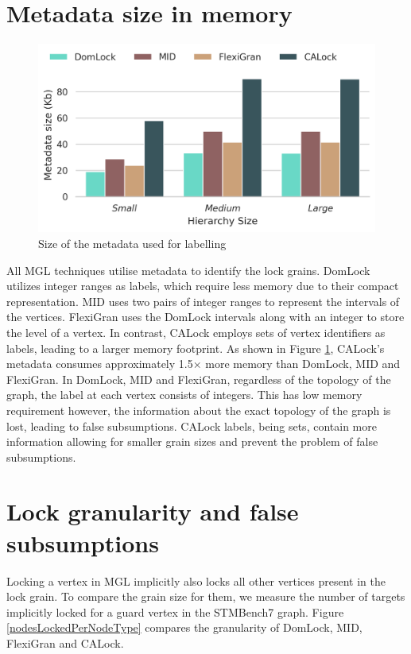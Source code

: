 \section{Metadata size in memory} \label{benchmark:metadatasize}
\begin{figure}[ht]
	\includegraphics[width=\columnwidth]{figures/PerformanceCharts/LabelsMemorySize.png}
	\caption{Size of the metadata used for labelling}
	\label{metadataSize}
\end{figure}

All MGL techniques utilise metadata to identify the lock grains.
DomLock utilizes integer ranges as labels, which require less memory due to their compact representation. 
MID uses two pairs of integer ranges to represent the intervals of the vertices.
FlexiGran uses the DomLock intervals along with an integer to store the level of a vertex.
In contrast, CALock employs sets of vertex identifiers as labels, leading to a larger memory footprint.
As shown in Figure \ref{metadataSize}, CALock's metadata consumes approximately 1.5$\times$ more memory than DomLock, MID and FlexiGran.
In DomLock, MID and FlexiGran, regardless of the topology of the graph, the label at each vertex consists of integers.
This has low memory requirement however, the information about the exact topology of the graph is lost, leading to false subsumptions.
CALock labels, being sets, contain more information allowing for smaller grain sizes and prevent the problem of false subsumptions.


\section{Lock granularity and false subsumptions}\label{benchmark:falseSubsumption}

Locking a vertex in MGL implicitly also locks all other vertices present in the lock grain. 
To compare the grain size for them, we measure the number of targets implicitly locked for a guard vertex in the STMBench7 graph. 
Figure \ref{nodesLockedPerNodeType} compares the granularity of DomLock, MID, FlexiGran and CALock.

